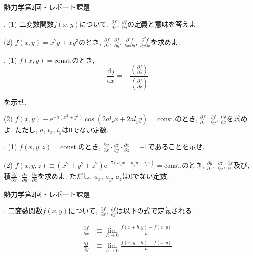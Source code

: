 \documentclass[dvipdfmx]{jsarticle}
\begin{document}
\centerline{熱力学第2回・レポート課題}
\medskip
\bigskip


. (1) 二変数関数$f(x, y)$について, $\displaystyle\frac{\partial f}{\partial x}$, $\displaystyle\frac{\partial f}{\partial y}$の定義と意味を答えよ. 

(2) $f(x, y) = x^2 y + x y^3$のとき, $\displaystyle\frac{\partial f}{\partial x}$, $\displaystyle\frac{\partial f}{\partial y}$, $\displaystyle\frac{\partial ^2 f}{\partial x \partial y}$, $\displaystyle\frac{\partial ^2 f}{\partial y \partial x}$を求めよ. 


. (1) $f(x, y) = \mathrm{const.}$のとき, 
\[
    \frac{\mathrm{d} y}{\mathrm{d} x} = - \frac{\left(\frac{\partial f}{\partial x}\right)}{\left(\frac{\partial f}{\partial y}\right)}
\]

を示せ. 

(2) $f(x, y) \equiv \mathrm{e}^{-a(x^2 + y^2)}\cos{(2 a l_x x + 2 a l_y y)} = \mathrm{const.}$のとき, $\displaystyle\frac{\partial f}{\partial x}$, $\displaystyle\frac{\partial f}{\partial y}$, $\displaystyle\frac{\mathrm{d} y}{\mathrm{d} x}$を求めよ. ただし, $a$, $l_x$, $l_y$は0でない定数. 

. (1) $f(x, y, z) = \mathrm{const.}$のとき, $\displaystyle\frac{\partial y}{\partial x} \cdot \displaystyle\frac{\partial z}{\partial y} \cdot \displaystyle\frac{\partial x}{\partial z} = -1$であることを示せ. 

(2) $f(x, y, z) \equiv (x^2 + y^2 + z^2) \mathrm{e}^{-2(a_x x + a_y y + a_z z)} = \mathrm{const.}$のとき, $\displaystyle\frac{\partial y}{\partial x}$, $\displaystyle\frac{\partial z}{\partial y}$, $\displaystyle\frac{\partial x}{\partial z}$及び, 積$\displaystyle\frac{\partial y}{\partial x} \cdot \displaystyle\frac{\partial z}{\partial y} \cdot \displaystyle\frac{\partial x}{\partial z}$を求めよ. ただし, $a_x$, $a_y$, $a_z$は0でない定数. 

\newpage

\centerline{熱力学第2回・レポート課題}
\medskip
{}

\bigskip


. 二変数関数$f(x, y)$について, $\displaystyle\frac{\partial f}{\partial x}$, $\displaystyle\frac{\partial f}{\partial y}$は以下の式で定義される. 

\begin{align*}
    \frac{\partial f}{\partial x} &\equiv \lim_{h \to 0} \frac{f(x + h, y) - f(x, y)}{h} \\
    \frac{\partial f}{\partial y} &\equiv \lim_{h \to 0} \frac{f(x, y + h) - f(x, y)}{h} 
\end{align*}
\end{document}
